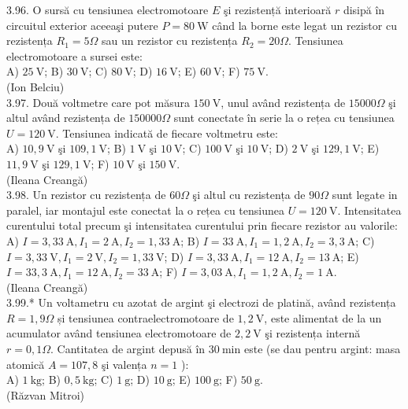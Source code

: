 3.96. O sursă cu tensiunea electromotoare $E$ şi rezistență interioară $r$ disipă în circuitul exterior aceeaşi putere $P=80 \mathrm{~W}$ când la borne este legat un rezistor cu rezistența $R_{1}=5 \Omega$ sau un rezistor cu rezistența $R_{2}=20 \Omega$. Tensiunea electromotoare a sursei este:\\ A) $25 \mathrm{~V}$; B) $30 \mathrm{~V}$; C) $80 \mathrm{~V}$; D) $16 \mathrm{~V}$; E) $60 \mathrm{~V}$; F) $75 \mathrm{~V}$.\\ (Ion Belciu)\\

3.97. Două voltmetre care pot măsura $150 \mathrm{~V}$, unul având rezistența de $15000 \Omega$ şi altul având rezistența de $150000 \Omega$ sunt conectate în serie la o rețea cu tensiunea $U=120 \mathrm{~V}$. Tensiunea indicată de fiecare voltmetru este:\\ A) $10,9 \mathrm{~V}$ şi $109,1 \mathrm{~V}$; B) $1 \mathrm{~V}$ şi $10 \mathrm{~V}$; C) $100 \mathrm{~V}$ şi $10 \mathrm{~V}$; D) $2 \mathrm{~V}$ şi $129,1 \mathrm{~V}$; E) $11,9 \mathrm{~V}$ şi $129,1 \mathrm{~V}$; F) $10 \mathrm{~V}$ şi $150 \mathrm{~V}$.\\ (Ileana Creangă)\\

3.98. Un rezistor cu rezistența de $60 \Omega$ şi altul cu rezistența de $90 \Omega$ sunt legate in paralel, iar montajul este conectat la o rețea cu tensiunea $U=120 \mathrm{~V}$. Intensitatea curentului total precum şi intensitatea curentului prin fiecare rezistor au valorile:\\ A) $I=3,33 \mathrm{~A} , I_{1}=2 \mathrm{~A} , I_{2}=1,33 \mathrm{~A}$; B) $I=33 \mathrm{~A} , I_{1}=1,2 \mathrm{~A} , I_{2}=3,3 \mathrm{~A}$; C) $I=3,33 \mathrm{~V} , I_{1}=2 \mathrm{~V} , I_{2}=1,33 \mathrm{~V}$; D) $I=3,33 \mathrm{~A} , I_{1}=12 \mathrm{~A} , I_{2}=13 \mathrm{~A}$; E) $I=33,3 \mathrm{~A} , I_{1}=12 \mathrm{~A} , I_{2}=33 \mathrm{~A}$; F) $I=3,03 \mathrm{~A} , I_{1}=1,2 \mathrm{~A} , I_{2}=1 \mathrm{~A}$.\\ (Ileana Creangă)\\

3.99.* Un voltametru cu azotat de argint şi electrozi de platină, având rezistența $R=1,9 \Omega$ și tensiunea contraelectromotoare de $1,2 \mathrm{~V}$, este alimentat de la un acumulator având tensiunea electromotoare de $2,2 \mathrm{~V}$ şi rezistența internă $r=0,1 \Omega$. Cantitatea de argint depusă în $30 \mathrm{~min}$ este (se dau pentru argint: masa atomică $A=107,8$ şi valența $n=1$ ):\\ A) $1 \mathrm{~kg}$; B) $0,5 \mathrm{~kg}$; C) $1 \mathrm{~g}$; D) $10 \mathrm{~g}$; E) $100 \mathrm{~g}$; F) $50 \mathrm{~g}$.\\ (Răzvan Mitroi)\\

